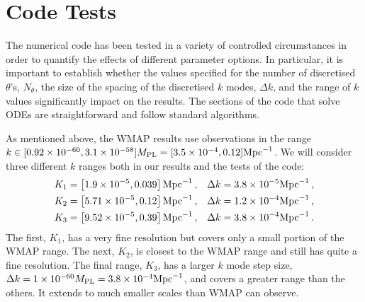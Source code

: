 \section{Code Tests}
\label{sec:tests-num}


The numerical code has been tested in a variety of controlled
circumstances in order to quantify the effects of different parameter options. In
particular, it is important to establish whether the values
specified for the number of discretised $\theta$'s, $N_\theta$, the size
of the
spacing of the discretised $k$ modes, $\Delta k$, and the range of
$k$ values significantly impact on the results. The sections
of the code that solve ODEs are straightforward and follow standard algorithms.


As mentioned above, the WMAP results \cite{Komatsu:2008hk} use
observations in the range $k\in [0.92 \times 10^{-60}, 3.1 \times
  10^{-58}]M_{\mathrm{PL}} = [3.5\times 10^{-4}, 0.12] \mathrm{Mpc}^{-1}$. We will
consider three different $k$ ranges both in our results and the tests
of the code\footnotemark:
%
\begin{align}
\label{eq:Krangedefns}
K_1 &= \left[1.9\times 10^{-5}, 0.039\right]\mathrm{Mpc}^{-1}\,, &\Delta k = 3.8\times 10^{-5}\mathrm{Mpc}^{-1}
\,,\nonumber\\
K_2 &= \left[5.71\times 10^{-5}, 0.12\right]\mathrm{Mpc}^{-1}\,, &\Delta k =
1.2\times 10^{-4}\mathrm{Mpc}^{-1}\,,
\nonumber\\ 
K_3 &= \left[9.52\times 10^{-5}, 0.39\right]\mathrm{Mpc}^{-1}\,, &\Delta k = 3.8\times 10^{-4}\mathrm{Mpc}^{-1}
\,.
\end{align}
% 
% 
The first, $K_1$, has a very fine resolution but covers only a small portion of the WMAP range. 
The next, $K_2$, is closest to the WMAP range and still has quite a fine resolution. 
The final
range, $K_3$, has a larger $k$ mode step size, $\Delta k = 1\times 10^{-60}M_{\mathrm{PL}} =
3.8\times 10^{-4}\mathrm{Mpc}^{-1}$, and
covers a greater range than the others. It extends to much smaller scales than WMAP can observe.


